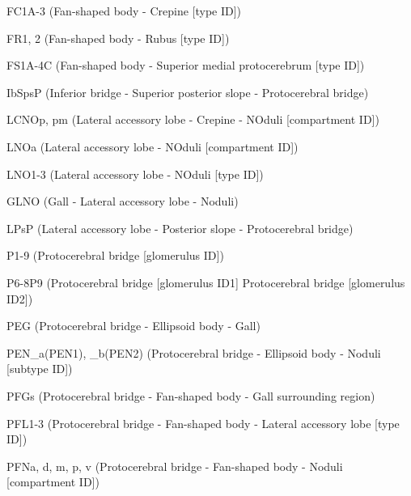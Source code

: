 \documentclass{article}
\begin{document}
{\footnotesize
\noindent\hspace*{1.0em}FC1A-3 (Fan-shaped body - Crepine [type ID])\par
\noindent\hspace*{1.0em}FR1, 2 (Fan-shaped body - Rubus [type ID])\par
\noindent\hspace*{1.0em}FS1A-4C (Fan-shaped body - Superior medial protocerebrum [type ID])\par
\noindent\hspace*{1.0em}IbSpsP (Inferior bridge - Superior posterior slope - Protocerebral bridge)\par
\noindent\hspace*{1.0em}LCNOp, pm (Lateral accessory lobe - Crepine - NOduli [compartment ID])\par
\noindent\hspace*{1.0em}LNOa (Lateral accessory lobe - NOduli [compartment ID])\par
\noindent\hspace*{1.0em}LNO1-3 (Lateral accessory lobe - NOduli [type ID])\par
\noindent\hspace*{1.0em}GLNO (Gall - Lateral accessory lobe - Noduli)\par
\noindent\hspace*{1.0em}LPsP (Lateral accessory lobe - Posterior slope - Protocerebral bridge)\par
\noindent\hspace*{1.0em}P1-9 (Protocerebral bridge [glomerulus ID])\par
\noindent\hspace*{1.0em}P6-8P9 (Protocerebral bridge [glomerulus ID1] Protocerebral bridge [glomerulus ID2])\par
\noindent\hspace*{1.0em}PEG (Protocerebral bridge - Ellipsoid body - Gall)\par
\noindent\hspace*{1.0em}PEN\_a(PEN1), \_b(PEN2) (Protocerebral bridge - Ellipsoid body - Noduli [subtype ID])\par
\noindent\hspace*{1.0em}PFGs (Protocerebral bridge - Fan-shaped body - Gall surrounding region)\par
\noindent\hspace*{1.0em}PFL1-3 (Protocerebral bridge - Fan-shaped body - Lateral accessory lobe [type ID])\par
\noindent\hspace*{1.0em}PFNa, d, m, p, v (Protocerebral bridge - Fan-shaped body - Noduli [compartment ID])\par
}
\end{document}
